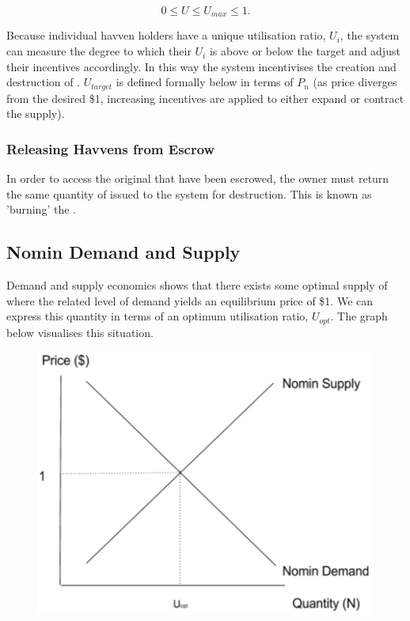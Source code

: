 $$ 0 \leq U \leq U_{max} \leq 1.$$

\noindent Because individual havven holders have a unique utilisation ratio, $ U_i $, the system can measure the degree to which their $ U_i $ is above or below the target and adjust their incentives accordingly. In this way the system incentivises the creation and destruction of \NOM{}. $ U_{target} $ is defined formally below in terms of $ P_n $ (as \NOM{} price diverges from the desired \$1, increasing incentives are applied to either expand or contract the supply).

\subsubsection{Releasing Havvens from Escrow}

\noindent In order to access the original \HAV{} that have been escrowed, the owner must return the same quantity of issued \NOM{} to the system for destruction. This is known as 'burning' the \NOM{}.

\newpage
\subsection{Nomin Demand and Supply} 

\noindent Demand and supply economics shows that there exists some optimal supply of \NOM{} where the related level of demand yields an equilibrium price of \$1. We can express this quantity in terms of an optimum utilisation ratio, $U_{opt}$. The graph below visualises this situation. \\

\begin{figure}[h!]
    \centering
    \includegraphics[width=.7\textwidth]{img/nomin-demand-vs-supply}
\end{figure}

